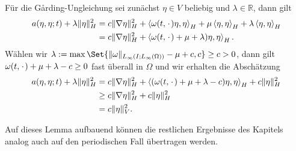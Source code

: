 \documentclass[../main.tex]{subfiles}
\begin{document}
\begin{Lemma}
\begin{Beweis}
        Für die G\aa{}rding-Ungleichung sei zunächst $\eta \in V$ beliebig und $\lambda \in \mathbb{R}$, dann gilt
        \begin{align}
            a(\eta, \eta; t) + \lambda \lVert\eta\rVert^{2}_{H}
            &= c \lVert\nabla \eta\rVert^{2}_{H} + \left\langle\omega(t, {\mkern2mu\cdot\mkern2mu}) \eta,\eta\right\rangle_{H} + \mu \left\langle\eta,\eta\right\rangle_{H} + \lambda \left\langle\eta,\eta\right\rangle_{H}
            \\&= c \lVert\nabla \eta\rVert^{2}_{H} + \left\langle\omega(t, {\mkern2mu\cdot\mkern2mu}) + \mu + \lambda) \eta,\eta\right\rangle_{H}.
        \end{align}
        Wählen wir $\lambda := \max\Set{\norm{\omega}_{L_{\infty}(I; L_{\infty}(\Omega))} - \mu + c, c} \geq c > 0$, dann gilt $\omega(t, {\mkern2mu\cdot\mkern2mu}) + \mu + \lambda - c \geq 0$ fast überall in $\Omega$ und wir erhalten die Abschätzung
        \begin{align}
            a(\eta, \eta; t) + \lambda \lVert\eta\rVert^{2}_{H}
            &= c \lVert\nabla \eta\rVert^{2}_{H} + \left\langle(\omega(t, {\mkern2mu\cdot\mkern2mu}) + \mu + \lambda - c) \eta,\eta\right\rangle_{H} + c \lVert\eta\rVert^{2}_{H} \\
            &\geq c \lVert\nabla \eta\rVert^{2}_{H} + c \lVert\eta\rVert^{2}_{H}
            \\&= c \lVert\eta\rVert^{2}_{V}.
        \end{align}
    \end{Beweis}
\end{Lemma}

Auf dieses Lemma aufbauend können die restlichen Ergebnisse des Kapitels analog auch auf den periodischen Fall übertragen werden.
\end{document}
